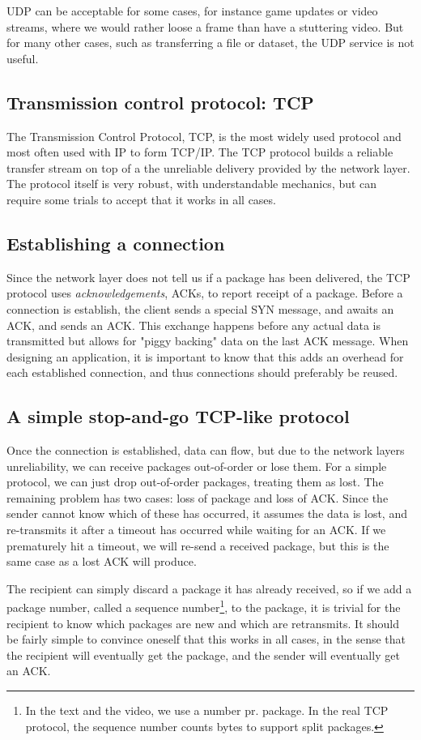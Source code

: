 UDP can be acceptable for some cases, for instance game updates or video streams, where we would rather loose a frame than have a stuttering video. But for many other cases, such as transferring a file or dataset, the UDP service is not useful.

\subsection{Transmission control protocol: TCP}
The Transmission Control Protocol, TCP, is the most widely used protocol and most often used with IP to form TCP/IP. The TCP protocol builds a reliable transfer stream on top of a the unreliable delivery provided by the network layer. The protocol itself is very robust, with understandable mechanics, but can require some trials to accept that it works in all cases.

\subsection{Establishing a connection}
Since the network layer does not tell us if a package has been delivered, the TCP protocol uses \emph{acknowledgements}, ACKs, to report receipt of a package. Before a connection is establish, the client sends a special SYN message, and awaits an ACK, and sends an ACK. This exchange happens before any actual data is transmitted but allows for "piggy backing" data on the last ACK message. When designing an application, it is important to know that this adds an overhead for each established connection, and thus connections should preferably be reused.

\subsection{A simple stop-and-go TCP-like protocol}
Once the connection is established, data can flow, but due to the network layers unreliability, we can receive packages out-of-order or lose them. For a simple protocol, we can just drop out-of-order packages, treating them as lost. The remaining problem has two cases: loss of package and loss of ACK. Since the sender cannot know which of these has occurred, it assumes the data is lost, and re-transmits it after a timeout has occurred while waiting for an ACK. If we prematurely hit a timeout, we will re-send a received package, but this is the same case as a lost ACK will produce.

The recipient can simply discard a package it has already received, so if we add a package number, called a sequence number\footnote{In the text and the video, we use a number pr. package. In the real TCP protocol, the sequence number counts bytes to support split packages.}, to the package, it is trivial for the recipient to know which packages are new and which are retransmits. It should be fairly simple to convince oneself that this works in all cases, in the sense that the recipient will eventually get the package, and the sender will eventually get an ACK.

